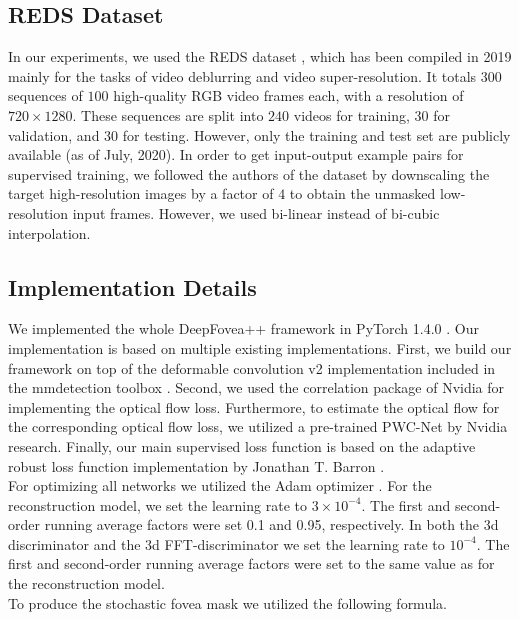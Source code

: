 \documentclass[10pt,twocolumn,letterpaper]{article}
\begin{document}
\subsection{REDS Dataset} \label{subsec:redsdataset}
In our experiments, we used the REDS dataset \cite{REDS}, which has been compiled in 2019 mainly for the tasks of video deblurring and video super-resolution. It totals $300$ sequences of $100$ high-quality RGB video frames each, with a resolution of $720\times 1280$. These sequences are split into $240$ videos for training, $30$ for validation, and $30$ for testing. However, only the training and test set are publicly available (as of July, 2020). In order to get input-output example pairs for supervised training, we followed the authors of the dataset by downscaling the target high-resolution images by a factor of $4$ to obtain the unmasked low-resolution input frames. However, we used bi-linear instead of bi-cubic interpolation. \cite{REDS}


\subsection{Implementation Details} \label{subsec:implementationdetails}
We implemented the whole DeepFovea++ framework in PyTorch 1.4.0 \cite{pytorch}. Our implementation is based on multiple existing implementations. First, we build our framework on top of the deformable convolution v2 \cite{deformableconv} implementation included in the mmdetection toolbox \cite{mmdetection}. Second, we used the correlation package \cite{flownet2} of Nvidia for implementing the optical flow loss. Furthermore, to estimate the optical flow for the corresponding optical flow loss, we utilized a pre-trained PWC-Net \cite{pwcnet} by Nvidia research. Finally, our main supervised loss function is based on the adaptive robust loss function implementation by Jonathan T. Barron \cite{adaptiveroubustloss}.\\

For optimizing all networks we utilized the Adam optimizer \cite{adam}. For the reconstruction model, we set the learning rate to $3\times 10^{-4}$. The first and second-order running average factors were set 0.1 and 0.95, respectively. In both the 3d discriminator and the 3d FFT-discriminator we set the learning rate to $10^{-4}$. The first and second-order running average factors were set to the same value as for the reconstruction model.\\
To produce the stochastic fovea mask we utilized the following formula.
\end{document}
